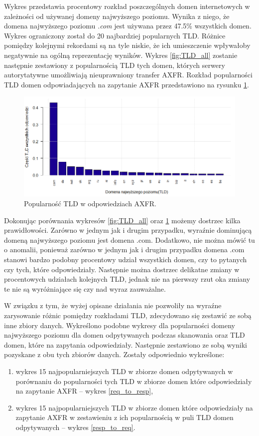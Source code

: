 Wykres przedstawia procentowy rozkład poszczególnych domen internetowych w zależności od używanej domeny najwyższego poziomu.
Wynika z niego, że domena najwyższego poziomu \textit{.com} jest używana przez 47.5\% wszystkich domen. Wykres ograniczony został
do 20 najbardziej popularnych TLD. Różnice pomiędzy kolejnymi rekordami są na tyle niskie, że ich umieszczenie wpływałoby negatywnie
na ogólną reprezentację wyników. Wykres \ref{fig:TLD_all} zostanie następnie zestawiony z popularnością TLD tych domen, których serwery
autorytatywne umożliwiają nieuprawniony transfer AXFR. Rozkład popularności TLD domen odpowiadających na zapytanie AXFR przedstawiono
na rysunku \ref{fig:resp}.
\begin{center}
	\begin{figure}
		\includegraphics[width=1.0\textwidth]{image/resp_no_title}
		\caption{Popularność TLD w odpowiedziach AXFR.}
		\label{fig:resp}
	\end{figure}
\end{center}

Dokonując porównania wykresów \ref{fig:TLD_all} oraz \ref{fig:resp} możemy dostrzec kilka prawidłowości. Zarówno w jednym jak i
drugim przypadku, wyraźnie dominującą domeną najwyższego poziomu jest domena .com. Dodatkowo, nie można mówić tu o anomalii,
ponieważ zarówno w jednym jak i drugim przypadku domena .com stanowi bardzo podobny procentowy udział wszystkich domen, czy to
pytanych czy tych, które odpowiedziały. Następnie można dostrzec delikatne zmiany w procentowych udziałach kolejnych TLD, jednak
nie na pierwszy rzut oka zmiany te nie są wyróżniające się czy nad wyraz zauważalne.

W związku z tym, że wyżej opisane działania nie pozwoliły na wyraźne zarysowanie różnic pomiędzy rozkładami TLD, zdecydowano się
zestawić ze sobą inne zbiory danych. Wykreślono podobne wykresy dla popularności domeny najwyższego poziomu dla domen odpytywanych
podczas skanowania oraz TLD domen, które na zapytania odpowiedziały. Następnie zestawiono ze sobą wyniki pozyskane z obu tych zbiorów
danych. Zostały odpowiednio wykreślone:
\begin{enumerate}
	\item wykres 15 najpopularniejszych TLD w zbiorze domen odpytywanych w porównaniu do popularności tych TLD w zbiorze domen
	które odpowiedziały na zapytanie AXFR -- wykres \ref{req_to_resp},
	\item wykres 15 najpopularniejszych TLD w zbiorze domen które odpowiedziały na zapytanie AXFR w zestawieniu z ich popularnością
	w puli TLD domen odpytywanych -- wykres \ref{resp_to_req}.
\end{enumerate}

